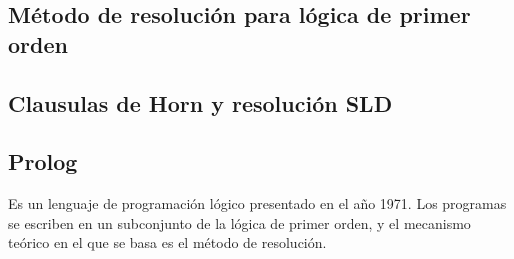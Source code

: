 \subsection{Método de resolución para lógica de primer orden}

\subsection{Clausulas de Horn y resolución SLD}

\subsection{Prolog}

Es un lenguaje de programación lógico presentado en el año 1971. Los programas se escriben en un subconjunto de la lógica de primer orden, y el mecanismo teórico en el que se basa es el método de resolución.
